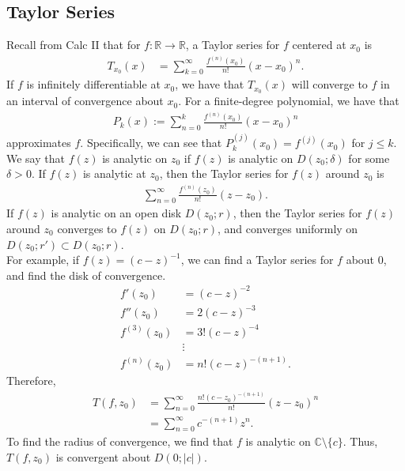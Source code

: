 \documentclass[10pt]{extarticle}
\newcommand{\R}{\mathbb{R}}
\newcommand{\C}{\mathbb{C}}
\begin{document}
  \subsection{Taylor Series}%
  Recall from Calc II that for $f: \R\rightarrow \R$, a Taylor series for $f$ centered at $x_0$ is
  \begin{align*}
    T_{x_0}(x) &= \sum_{k=0}^{\infty}\frac{f^{(n)}(x_0)}{n!}(x-x_0)^n.
  \end{align*}
  If $f$ is infinitely differentiable at $x_0$, we have that $T_{x_0}(x)$ will converge to $f$ in an interval of convergence about $x_0$. For a finite-degree polynomial, we have that
  \begin{align*}
    P_k(x) := \sum_{n=0}^{k}\frac{f^{(n)}(x_0)}{n!}(x-x_0)^n
  \end{align*}
  approximates $f$. Specifically, we can see that $P_k^{(j)}(x_0) = f^{(j)}(x_0)$ for $j \leq k$.\\

  We say that $f(z)$ is analytic on $z_0$ if $f(z)$ is analytic on $D(z_0;\delta)$ for some $\delta > 0$. If $f(z)$ is analytic at $z_0$, then the Taylor series for $f(z)$ around $z_0$ is
  \begin{align*}
    \sum_{n=0}^{\infty}\frac{f^{(n)}(z_0)}{n!}(z-z_0).
  \end{align*}
  If $f(z)$ is analytic on an open disk $D(z_0;r)$, then the Taylor series for $f(z)$ around $z_0$ converges to $f(z)$ on $D(z_0;r)$, and converges uniformly on $D(z_0;r')\subset D(z_0;r)$.\\

  For example, if $f(z) = (c-z)^{-1}$, we can find a Taylor series for $f$ about $0$, and find the disk of convergence.
  \begin{align*}
    f'(z_0) &= (c-z)^{-2}\\
    f''(z_0) &= 2(c-z)^{-3}\\
    f^{(3)}(z_0) &= 3!(c-z)^{-4}\\
               &\vdots\\
    f^{(n)}(z_0) &= n!(c-z)^{-(n+1)}.
  \end{align*}
  Therefore,
  \begin{align*}
    T(f,z_0) &= \sum_{n=0}^{\infty}\frac{n!(c-z_0)^{-(n+1)}}{n!}(z-z_0)^{n}\\
             &= \sum_{n=0}^{\infty}c^{-(n+1)}z^n.
  \end{align*}
  To find the radius of convergence, we find that $f$ is analytic on $\C\setminus \{c\}$. Thus, $T(f,z_0)$ is convergent about $D(0;|c|)$.\\
\end{document}
